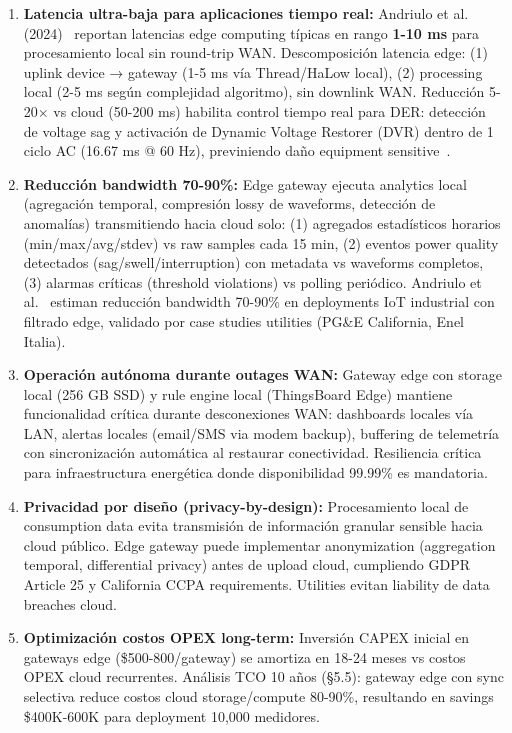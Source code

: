 \begin{enumerate}
\item \textbf{Latencia ultra-baja para aplicaciones tiempo real:} Andriulo et al. (2024)~\cite{andriuloEdgeComputingCloud2024} reportan latencias edge computing típicas en rango \textbf{1-10 ms} para procesamiento local sin round-trip WAN. Descomposición latencia edge: (1) uplink device → gateway (1-5 ms vía Thread/HaLow local), (2) processing local (2-5 ms según complejidad algoritmo), sin downlink WAN. Reducción 5-20$\times$ vs cloud (50-200 ms) habilita control tiempo real para DER: detección de voltage sag y activación de Dynamic Voltage Restorer (DVR) dentro de 1 ciclo AC (16.67 ms @ 60 Hz), previniendo daño equipment sensitive~\cite{minhEdgeComputingIoTEnabled2022}.

\item \textbf{Reducción bandwidth 70-90\%:} Edge gateway ejecuta analytics local (agregación temporal, compresión lossy de waveforms, detección de anomalías) transmitiendo hacia cloud solo: (1) agregados estadísticos horarios (min/max/avg/stdev) vs raw samples cada 15 min, (2) eventos power quality detectados (sag/swell/interruption) con metadata vs waveforms completos, (3) alarmas críticas (threshold violations) vs polling periódico. Andriulo et al.~\cite{andriuloEdgeComputingCloud2024} estiman reducción bandwidth 70-90\% en deployments IoT industrial con filtrado edge, validado por case studies utilities (PG\&E California, Enel Italia).

\item \textbf{Operación autónoma durante outages WAN:} Gateway edge con storage local (256 GB SSD) y rule engine local (ThingsBoard Edge) mantiene funcionalidad crítica durante desconexiones WAN: dashboards locales vía LAN, alertas locales (email/SMS via modem backup), buffering de telemetría con sincronización automática al restaurar conectividad. Resiliencia crítica para infraestructura energética donde disponibilidad 99.99\% es mandatoria.

\item \textbf{Privacidad por diseño (privacy-by-design):} Procesamiento local de consumption data evita transmisión de información granular sensible hacia cloud público. Edge gateway puede implementar anonymization (aggregation temporal, differential privacy) antes de upload cloud, cumpliendo GDPR Article 25 y California CCPA requirements. Utilities evitan liability de data breaches cloud.

\item \textbf{Optimización costos OPEX long-term:} Inversión CAPEX inicial en gateways edge (\$500-800/gateway) se amortiza en 18-24 meses vs costos OPEX cloud recurrentes. Análisis TCO 10 años (§5.5): gateway edge con sync selectiva reduce costos cloud storage/compute 80-90\%, resultando en savings \$400K-600K para deployment 10,000 medidores.
\end{enumerate}


